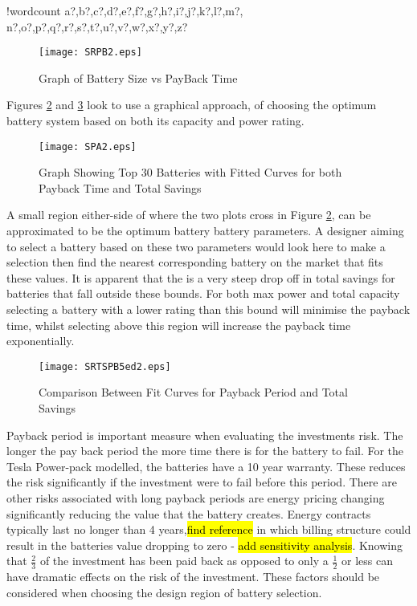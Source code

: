 \documentclass[fontsize=9.5pt]{extarticle}
\numberwithin{figure}{section} %
\newcounter{words}
\newenvironment{counted}{%
  \setcounter{words}{0}
  \SearchList!{wordcount}{\stepcounter{words}}
    {a?,b?,c?,d?,e?,f?,g?,h?,i?,j?,k?,l?,m?,
    n?,o?,p?,q?,r?,s?,t?,u?,v?,w?,x?,y?,z?}
  \UndoBoundary{'}
  \SearchOrder{p;}}{%
  \StopSearching}
\begin{document}
\begin{counted}
\begin{figure}[H]
 \centering
 \texttt{[image: SRPB2.eps]}
 \caption{Graph of Battery Size vs PayBack Time}
 \label{SRPB2}
\end{figure}

Figures \ref{SPA2} and \ref{SRTSPB5} look to use a graphical approach,
of choosing the optimum battery system based on both its capacity and
power rating.

\begin{figure}[H]
\centering
\texttt{[image: SPA2.eps]}
\caption{Graph Showing Top 30 Batteries with Fitted Curves for both Payback Time and Total Savings}
\label{SPA2}
\end{figure}

A small region either-side of where the two plots cross in Figure
\ref{SPA2}, can be approximated to be the optimum battery battery
parameters. A designer aiming to select a battery based on these two
parameters would look here to make a selection then find the nearest
corresponding battery on the market that fits these values. It is
apparent that the is a very steep drop off in total savings for
batteries that fall outside these bounds. For both max power and total
capacity selecting a battery with a lower rating than this bound will
minimise the payback time, whilst selecting above this region will
increase the payback time exponentially.

\begin{figure}[H]
 \centering
 \texttt{[image: SRTSPB5ed2.eps]}
 \caption{Comparison Between Fit Curves for Payback Period and Total Savings}
 \label{SRTSPB5}
 \end{figure}

Payback period is important measure when evaluating the investments
risk. The longer the pay back period the more time there is for the
battery to fail. For the Tesla Power-pack modelled, the batteries have a
10 year warranty. These reduces the risk significantly if the investment
were to fail before this period. There are other risks associated with
long payback periods are energy pricing changing significantly reducing
the value that the battery creates. Energy contracts typically last no
longer than 4 years,\hl{find reference} in which billing structure could
result in the batteries value dropping to zero -
\hl{add sensitivity analysis}. Knowing that \(\frac{2}{3}\) of the
investment has been paid back as opposed to only a \(\frac{1}{2}\) or
less can have dramatic effects on the risk of the investment. These
factors should be considered when choosing the design region of battery
selection.


\end{counted}
\end{document}
